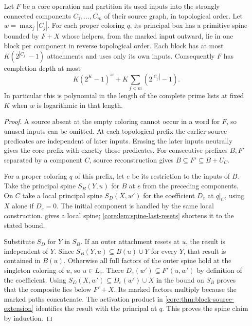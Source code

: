 \begin{theorem}\label{core:thm:local-principal-spines}
Let $F$ be a core operation and partition its used inputs into the
strongly connected components $C_1,\ldots,C_m$ of their source graph,
in topological order. Let $w=\max_j|C_j|$.
For each proper coloring $q$, its principal box has a primitive spine
bounded by $F+X$ whose helpers, from the marked input outward, lie in
one block per component in reverse topological order. Each block has
at most $K(2^{|C_j|}-1)$ attachments and uses only its own inputs.
Consequently $F$ has completion depth at most
\[
 K(2^K-1)^w + K\sum_{j<m}(2^{|C_j|}-1).
\]
In particular this is polynomial in the length of the complete prime
lists at fixed $K$ when $w$ is logarithmic in that length.
\end{theorem}
\begin{proof}
A source absent at the empty coloring cannot occur in a word for
$F$, so unused inputs can be omitted. At each topological prefix the
earlier source predicates are independent of later inputs. Erasing
the later inputs neutrally gives the core prefix with exactly those
predicates. For consecutive prefixes $B,F'$ separated by a component
$C$, source reconstruction gives $B\subseteq F'\subseteq B+U_C$.

For a proper coloring $q$ of this prefix, let $e$ be its restriction
to the inputs of $B$.
Take the principal spine $S_B(Y,u)$ for $B$ at $e$ from the preceding
components. On $C$ take a local principal spine $S_D(X,w')$ for
the coefficient $D_e$ at $q|_C$, using $X$ alone if $D_e=0$.
The initial component is handled by the same local construction.
 gives a local spine;
\cref{core:lem:spine-last-resets} shortens it to the stated bound.

Substitute $S_D$ for $Y$ in $S_B$. If an outer attachment resets at
$u$, the result is independent of $Y$. Since $S_B(Y,u)\subseteq B(u)\cup Y$
for every $Y$, that result is contained in $B(u)$. Otherwise all full
factors of the outer spine hold at the singleton coloring of $u$,
so $u\in L_e$. There $D_e(w')\subseteq F'(u,w')$ by definition of the
coefficient. Using $S_D(X,w')\subseteq D_e(w')\cup X$ in the bound on
$S_B$ proves that the composite lies below $F'+X$. Its marked factors
multiply because the marked paths concatenate. The activation product
in \cref{core:thm:block-source-extension} identifies the result with
the principal at $q$. This proves the spine claim by induction.


\end{proof}
